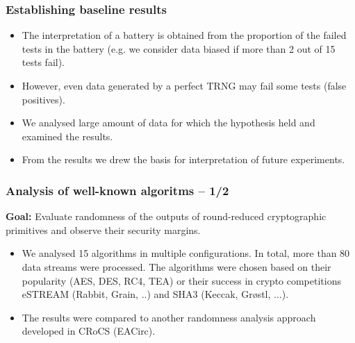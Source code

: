\documentclass[aspectratio=169]{beamer}
\begin{document}
\begin{frame}
\frametitle{Establishing baseline results}
\begin{itemize}
\item The interpretation of a battery is obtained from the proportion of the failed tests in the battery (e.g. we consider data biased if more than 2 out of 15 tests fail). 
\item However, even data generated by a perfect TRNG may fail some tests (false positives).
\item We analysed large amount of data for which the hypothesis held and examined the results.
\item From the results we drew the basis for interpretation of future experiments.
\end{itemize}
\end{frame}

\begin{frame}
\frametitle{Analysis of well-known algoritms -- 1/2}
\textbf{Goal:} Evaluate randomness of the outputs of round-reduced cryptographic primitives and observe their security margins.
\vspace{.3cm}
\begin{itemize}
\item We analysed 15 algorithms in multiple configurations. In total, more than 80 data streams were processed. The algorithms were chosen based on their popularity (AES, DES, RC4, TEA) or their success in crypto competitions eSTREAM (Rabbit, Grain, ..) and SHA3 (Keccak, Gr\o stl, ...).
\item The results were compared to another randomness analysis approach developed in CRoCS (EACirc).
\end{itemize}
\end{frame}
\end{document}
